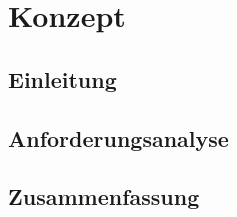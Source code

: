 \section{Konzept}
\subsection{Einleitung}

\subsection{Anforderungsanalyse}

\subsection{Zusammenfassung}